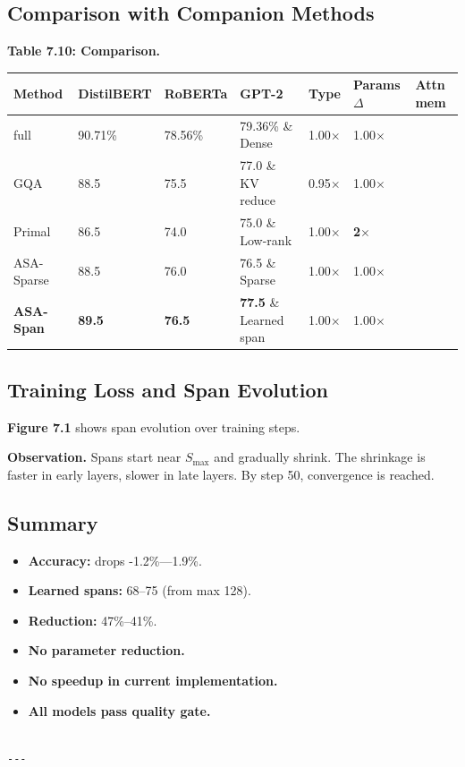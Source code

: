 \subsection{Comparison with Companion Methods}

\textbf{Table 7.10: Comparison.}

\begin{table}[H]
\centering
\small
\begin{tabular}{lllllll}
\toprule
\textbf{Method} & \textbf{DistilBERT} & \textbf{RoBERTa} & \textbf{GPT-2} & \textbf{Type} & \textbf{Params $\Delta$} & \textbf{Attn mem} \\
\midrule
full & 90.71\% & 78.56\% & 79.36\% \& Dense & 1.00$\times$ & 1.00$\times$ \\
GQA & 88.5 & 75.5 & 77.0 \& KV reduce & 0.95$\times$ & 1.00$\times$ \\
Primal & 86.5 & 74.0 & 75.0 \& Low-rank & 1.00$\times$ & \textbf{2$\times$} \\
ASA-Sparse & 88.5 & 76.0 & 76.5 \& Sparse & 1.00$\times$ & 1.00$\times$ \\
\textbf{ASA-Span} & \textbf{89.5} & \textbf{76.5} & \textbf{77.5} \& Learned span & 1.00$\times$ & 1.00$\times$ \\
\bottomrule
\end{tabular}
\end{table}

\subsection{Training Loss and Span Evolution}

\textbf{Figure 7.1} shows span evolution over training steps.

\textbf{Observation.} Spans start near $S_\text{max}$ and gradually shrink. The 
shrinkage is faster in early layers, slower in late layers. By step 50, 
convergence is reached.

\subsection{Summary}

\begin{itemize}
\item \textbf{Accuracy:} drops -1.2\%---1.9\%.
\item \textbf{Learned spans:} 68--75 (from max 128).
\item \textbf{Reduction:} 47\%--41\%.
\item \textbf{No parameter reduction.}
\item \textbf{No speedup in current implementation.}
\item \textbf{All models pass quality gate.}
\end{itemize}
\begin{lstlisting}

---
\end{lstlisting}
